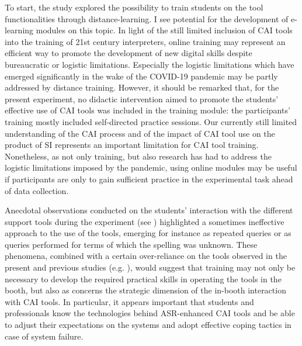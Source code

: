 To start, the study explored the possibility to train students on the tool functionalities through distance-learning. I see potential for the development of e-learning modules on this topic. In light of the still limited inclusion of CAI tools into the training of 21st century interpreters, online training may represent an efficient way to promote the development of new digital skills despite bureaucratic or logistic limitations. Especially the logistic limitations which have emerged significantly in the wake of the COVID-19 pandemic may be partly addressed by distance training. However, it should be remarked that, for the present experiment, no didactic intervention aimed to promote the students' effective use of CAI tools was included in the training module: the participants' training mostly included self-directed practice sessions. Our currently still limited understanding of the CAI process and of the impact of CAI tool use on the product of SI represents an important limitation for CAI tool training. Nonetheless, as not only training, but also research has had to address the logistic limitations imposed by the pandemic, using online modules may be useful if participants are only to gain sufficient practice in the experimental task ahead of data collection.

Anecdotal observations conducted on the students' interaction with the different support tools during the experiment (see ) highlighted a sometimes ineffective approach to the use of the tools, emerging for instance as repeated queries or as queries performed for terms of which the spelling was unknown. These phenomena, combined with a certain over-reliance on the tools observed in the present and previous studies (e.g. \citealt{prandi_uso_2015,prandi_use_2015,van_cauwenberghe_etude_2020}), would suggest that training may not only be necessary to develop the required practical skills in operating the tools in the booth, but also as concerns the strategic dimension of the in-booth interaction with CAI tools. In particular, it appears important that students and professionals know the technologies behind ASR-enhanced CAI tools and be able to adjust their expectations on the systems and adopt effective coping tactics in case of system failure.

